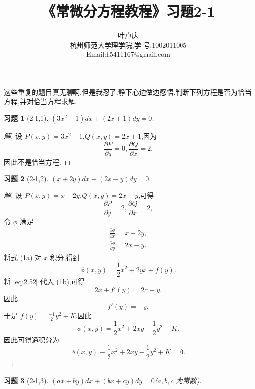 \documentclass[twoside,11pt]{article}
\newtheorem*{cdtheorem}{习题}
\newenvironment{exercise}
{\begin{mdframed}[backgroundcolor=gray!40,rightline=false,leftline=false,topline=false,bottomline=false]\begin{cdtheorem}}
    {\end{cdtheorem}\end{mdframed}}
\newcommand{\pa}{\partial} \newcommand{\Om}{\Omega}
\begin{document}
  \title{{\bf {《常微分方程教程》习题2-1}}} \author{{叶卢庆} \\{{
        \small{杭州师范大学理学院,学
          号:1002011005}}}\\\small{Email:h5411167@gmail.com}}
  \maketitle
  这些重复的题目真无聊啊,但是我忍了.静下心边做边感悟.判断下列方程是否为恰当方程,并对恰当方程求解.
  \begin{exercise}[2-1,1]
    $(3x^2-1)dx+(2x+1)dy=0$.
  \end{exercise}
  \begin{proof}[解]
    设 $P(x,y)=3x^2-1$,$Q(x,y)=2x+1$,因为
$$
\frac{\partial P}{\partial y}=0,\frac{\partial Q}{\partial x}=2.
$$
因此不是恰当方程.
\end{proof}
\begin{exercise}[2-1,2]
  $(x+2y)dx+(2x-y)dy=0.$
\end{exercise}
\begin{proof}[解]
  设 $P(x,y)=x+2y$,$Q(x,y)=2x-y$,可得
$$
\frac{\pa P}{\pa y}=2,\frac{\pa Q}{\pa x}=2,
$$
令 $\phi$ 满足
\begin{subequations}
  \label{eq:2,07pm}
  \begin{align}
    \frac{\pa \phi}{\pa x}=x+2y,\\
    \frac{\pa \phi}{\pa y}=2x-y.
  \end{align}
\end{subequations}
将式 (1a) 对 $x$ 积分,得到
\begin{equation}
  \label{eq:2.52}
  \phi(x,y)=\frac{1}{2}x^2+2yx+f(y).
\end{equation}
将 \eqref{eq:2.52} 代入 (1b),可得
\begin{equation}
  \label{eq:2.54pm}
  2x+f'(y)=2x-y.
\end{equation}
因此
\begin{equation}
  \label{eq:2.54pm}
  f'(y)=-y.
\end{equation}
于是 $f(y)=\frac{-1}{2}y^2+K$.因此
\begin{equation}
  \label{eq:2.55pm}
  \phi(x,y)=\frac{1}{2}x^2+2xy-\frac{1}{2}y^2+K.
\end{equation}
因此可得通积分为
$$
\phi(x,y)\equiv\frac{1}{2}x^2+2xy-\frac{1}{2}y^2+K=0.
$$
\end{proof}
\begin{exercise}[2-1,3]
  $(ax+by)dx+(bx+cy)dy=0$($a,b,c$ 为常数).
\end{exercise}
\end{document}
